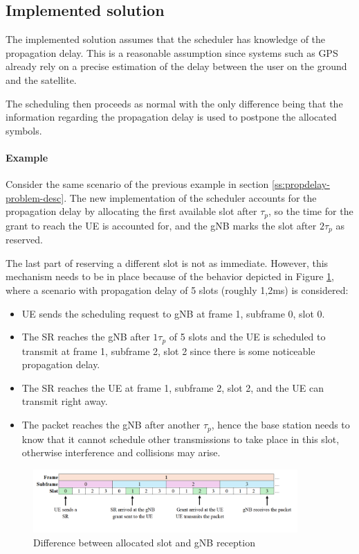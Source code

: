 \subsection{Implemented solution}
\label{ss:propdelay-problem-sol}
The implemented solution assumes that the scheduler has knowledge of the propagation delay. This is a reasonable assumption since systems such as GPS already rely on a precise estimation of the delay between the user on the ground and the satellite.

The scheduling then proceeds as normal with the only difference being that the information regarding the propagation delay is used to postpone the allocated symbols. 

\paragraph{Example} Consider the same scenario of the previous example in section \ref{ss:propdelay-problem-desc}. The new implementation of the scheduler accounts for the propagation delay by allocating the first available slot after $\tau_p$, so the time for the grant to reach the \ac{UE} is accounted for, and the \ac{gNB} marks the slot after $2\tau_p$ as reserved.

The last part of reserving a different slot is not as immediate. However, this mechanism needs to be in place because of the behavior depicted in Figure \ref{fig:scheduler-allocations-pd}, where a scenario with propagation delay of 5 slots (roughly 1,2ms) is considered:


\begin{itemize}
    \item \ac{UE} sends the scheduling request to \ac{gNB} at frame 1, subframe 0, slot 0.
    \item The \ac{SR} reaches the \ac{gNB} after $1\tau_p$ of 5 slots and the \ac{UE} is scheduled to transmit at frame 1, subframe 2, slot 2 since there is some noticeable propagation delay.
    \item The \ac{SR} reaches the \ac{UE} at frame 1, subframe 2, slot 2, and the \ac{UE} can transmit right away.
    \item The packet reaches the \ac{gNB} after another $\tau_p$, hence the base station needs to know that it cannot schedule other transmissions to take place in this slot, otherwise interference and collisions may arise.
\end{itemize}

\begin{figure}[ht]
    \centering
    \includegraphics[width=0.9\textwidth]{res/scheduler-allocation-pd.png}
    \caption{Difference between allocated slot and gNB reception}
    \label{fig:scheduler-allocations-pd}
\end{figure}

